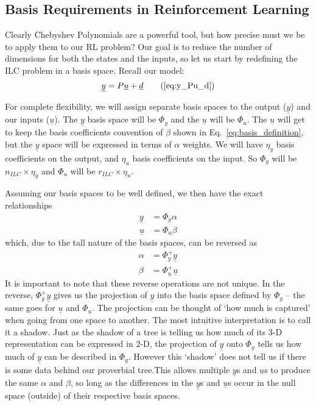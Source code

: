 \FloatBarrier\subsection{Basis Requirements in Reinforcement Learning}

Clearly Chebyshev Polynomials are a powerful tool, but how precise must we be to apply them to our RL problem? Our goal is to reduce the number of dimensions for both the states and the inputs, so let us start by redefining the ILC problem in a basis space. Recall our model:
\begin{equation}
	\underline{y} = P\underline{u} + \underline{d}
    \tag{\ref{eq:y_Pu_d}}\\
\end{equation}

For complete flexibility, we will assign separate basis spaces to the output ($\underline{y}$) and our inputs ($\underline{u}$). The $\underline{y}$ basis space will be $\Phi_y$ and the $\underline{u}$ will be $\Phi_u$. The $\underline{u}$ will get to keep the basis coefficients convention of $\beta$ shown in Eq.~\ref{eq:basis_definition}, but the $\underline{y}$ space will be expressed in terms of $\alpha$ weights. We will have $\eta_y$ basis coefficients on the output, and $\eta_u$ basis coefficients on the input. So $\Phi_y$ will be $n_{ILC} \times \eta_y$ and $\Phi_u$ will be $r_{ILC} \times \eta_u$. 

Assuming our basis spaces to be well defined, we then have the exact relationships
\begin{align}
    \underline{y} &= \Phi_y \alpha  \label{eq:y_Ty_a} \\
    \underline{u} &= \Phi_u \beta   \label{eq:u_Tu_b}
\end{align}
which, due to the tall nature of the basis spaces, can be reversed as
\begin{align}
    \alpha &= \Phi_y^+ \underline{y}   \label{eq:a_pinv_Ty_y} \\
    \beta &= \Phi_u^+ \underline{u}    \label{eq:b_pinv_Tu_u}
\end{align}
It is important to note that these reverse operations are not unique. In the reverse, $\Phi_y^+ \underline{y}$ gives us the projection of $\underline{y}$ into the basis space defined by $\Phi_y$ -- the same goes for $\underline{u}$ and $\Phi_u$. The projection can be thought of `how much is captured' when going from one space to another. The most intuitive interpretation is to call it a shadow. Just as the shadow of a tree is telling us how much of its 3-D representation can be expressed in 2-D, the projection of $\underline{y}$ onto $\Phi_y$ tells us how much of $\underline{y}$ can be described in $\Phi_y$. However this `shadow' does not tell us if there is some data behind our proverbial tree.This allows multiple $\underline{y}$s and $\underline{u}$s to produce the same $\alpha$ and $\beta$, so long as the differences in the $\underline{y}$s and $\underline{u}$s occur in the null space (outside) of their respective basis spaces.


